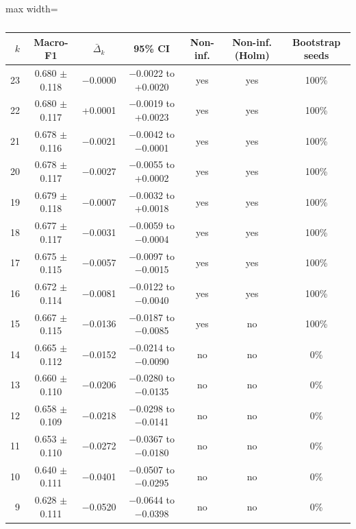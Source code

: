 \begin{table}[t]
\centering
\small
\caption{}
\label{tab:putemg}
\setlength{\tabcolsep}{4pt}
\begin{adjustbox}{max width=\textwidth}
\begin{tabular}{rcccccc}
\toprule
$k$ & Macro-F1 & $\bar\Delta_k$ & 95\% CI & Non-inf. & Non-inf. (Holm) & Bootstrap seeds \\
\midrule
23 & 0.680 $\pm$ 0.118 & $-$0.0000 & $-$0.0022 to +0.0020 & yes & yes & 100\% \\
22 & 0.680 $\pm$ 0.117 & +0.0001 & $-$0.0019 to +0.0023 & yes & yes & 100\% \\
21 & 0.678 $\pm$ 0.116 & $-$0.0021 & $-$0.0042 to $-$0.0001 & yes & yes & 100\% \\
20 & 0.678 $\pm$ 0.117 & $-$0.0027 & $-$0.0055 to +0.0002 & yes & yes & 100\% \\
19 & 0.679 $\pm$ 0.118 & $-$0.0007 & $-$0.0032 to +0.0018 & yes & yes & 100\% \\
18 & 0.677 $\pm$ 0.117 & $-$0.0031 & $-$0.0059 to $-$0.0004 & yes & yes & 100\% \\
17 & 0.675 $\pm$ 0.115 & $-$0.0057 & $-$0.0097 to $-$0.0015 & yes & yes & 100\% \\
16 & 0.672 $\pm$ 0.114 & $-$0.0081 & $-$0.0122 to $-$0.0040 & yes & yes & 100\% \\
15 & 0.667 $\pm$ 0.115 & $-$0.0136 & $-$0.0187 to $-$0.0085 & yes & no & 100\% \\
14 & 0.665 $\pm$ 0.112 & $-$0.0152 & $-$0.0214 to $-$0.0090 & no & no & 0\% \\
13 & 0.660 $\pm$ 0.110 & $-$0.0206 & $-$0.0280 to $-$0.0135 & no & no & 0\% \\
12 & 0.658 $\pm$ 0.109 & $-$0.0218 & $-$0.0298 to $-$0.0141 & no & no & 0\% \\
11 & 0.653 $\pm$ 0.110 & $-$0.0272 & $-$0.0367 to $-$0.0180 & no & no & 0\% \\
10 & 0.640 $\pm$ 0.111 & $-$0.0401 & $-$0.0507 to $-$0.0295 & no & no & 0\% \\
9 & 0.628 $\pm$ 0.111 & $-$0.0520 & $-$0.0644 to $-$0.0398 & no & no & 0\% \\

\end{tabular}
\end{adjustbox}
\end{table}
